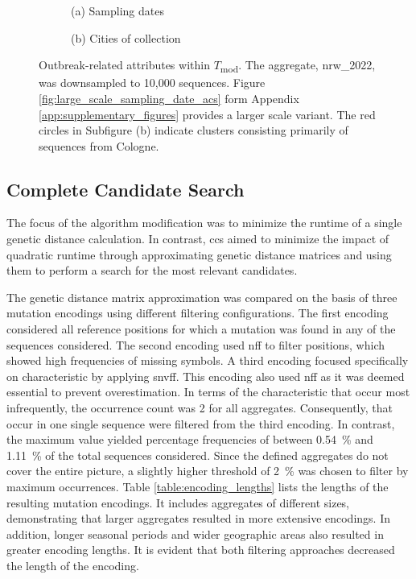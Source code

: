 \begin{figure}[H]
  \centering
  \begin{subfigure}[b]{.495\textwidth}
    
    \caption*{(a) Sampling dates}
  \end{subfigure}
    \begin{subfigure}[b]{.495\textwidth}
    
    \caption*{(b) Cities of collection}
  \end{subfigure}
  \caption[Outbreak-related attributes within $T$\textsubscript{mod}]{Outbreak-related attributes within $T$\textsubscript{mod}. The aggregate, nrw\_2022, was downsampled to 10,000 sequences. Figure \ref{fig:large_scale_sampling_date_acs} form Appendix \ref{app:supplementary_figures} provides a larger scale variant. The red circles in Subfigure (b) indicate clusters consisting primarily of sequences from Cologne.}
  \label{fig:outbreak_releated_attributes_optimized}
\end{figure}

\subsection{Complete Candidate Search}
The focus of the algorithm modification was to minimize the runtime of a single genetic distance calculation. In contrast, \acrshort{ccs} aimed to minimize the impact of quadratic runtime through approximating genetic distance matrices and using them to perform a search for the most relevant candidates.

The genetic distance matrix approximation was compared on the basis of three mutation encodings using different filtering configurations. The first encoding considered all reference positions for which a mutation was found in any of the sequences considered. The second encoding used \acrshort{nff} to filter positions, which showed high frequencies of missing symbols. A third encoding focused specifically on characteristic  by applying \acrshort{snvff}. This encoding also used \acrshort{nff} as it was deemed essential to prevent overestimation. 
In terms of the characteristic  that occur most infrequently, the occurrence count was 2 for all aggregates. Consequently,  that occur in one single sequence were filtered from the third encoding. In contrast, the maximum value yielded percentage frequencies of  between 0.54~\% and 1.11~\% of the total sequences considered. Since the defined aggregates do not cover the entire picture, a slightly higher threshold of 2~\% was chosen to filter  by maximum occurrences.
Table \ref{table:encoding_lengths} lists the lengths of the resulting mutation encodings. It includes aggregates of different sizes, demonstrating that larger aggregates resulted in more extensive encodings. In addition, longer seasonal periods and wider geographic areas also resulted in greater encoding lengths. It is evident that both filtering approaches decreased the length of the encoding.

